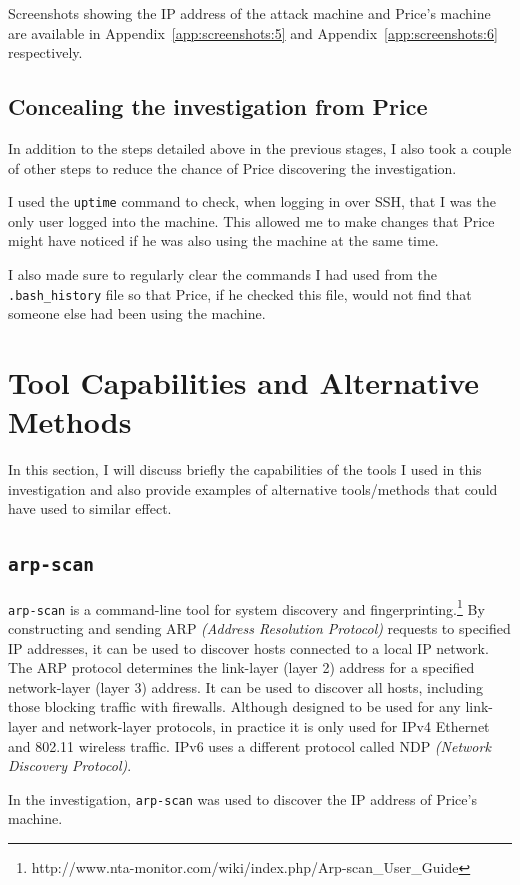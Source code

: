 \documentclass[12pt]{report}
\newcommand{\term}[1]{\colorbox{light-gray}{\texttt{#1}}}
\begin{document}
Screenshots showing the IP address of the attack machine and Price's machine are available in Appendix~\ref{app:screenshots:5} and Appendix~\ref{app:screenshots:6} respectively.


\section{Concealing the investigation from Price}
In addition to the steps detailed above in the previous stages, I also took a couple of other steps to reduce the chance of Price discovering the investigation.

I used the \term{uptime} command to check, when logging in over SSH, that I was the only user logged into the machine. This allowed me to make changes that Price might have noticed if he was also using the machine at the same time.

I also made sure to regularly clear the commands I had used from the \texttt{.bash\_history} file so that Price, if he checked this file, would not find that someone else had been using the machine.


\pagebreak
\chapter{Tool Capabilities and Alternative Methods}
In this section, I will discuss briefly the capabilities of the tools I used in this investigation and also provide examples of alternative tools/methods that could have used to similar effect.

\section{\texttt{arp-scan}}
\texttt{arp-scan} is a command-line tool for system discovery and fingerprinting.\footnote{http://www.nta-monitor.com/wiki/index.php/Arp-scan\_User\_Guide} By constructing and sending ARP \textit{(Address Resolution Protocol)} requests to specified IP addresses, it can be used to discover hosts connected to a local IP network. The ARP protocol determines the link-layer (layer 2) address for a specified network-layer (layer 3) address. It can be used to discover all hosts, including those blocking traffic with firewalls. Although designed to be used for any link-layer and network-layer protocols, in practice it is only used for IPv4 Ethernet and 802.11 wireless traffic. IPv6 uses a different protocol called NDP \textit{(Network Discovery Protocol)}.

In the investigation, \texttt{arp-scan} was used to discover the IP address of Price's machine.
\end{document}
